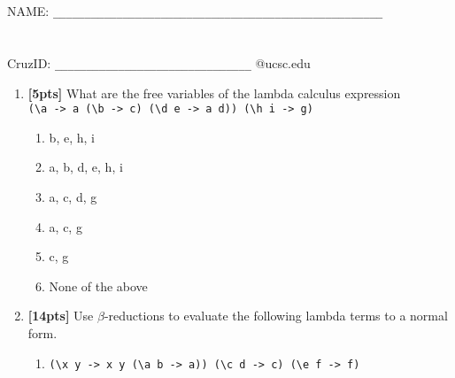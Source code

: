 \documentclass[paper=letter, fontsize=13pt]{article} %
\numberwithin{equation}{section} %
\newif\ifshowanswers\showanswersfalse
\begin{document}
\bigskip
\bigskip
\bigskip
\bigskip
\bigskip
\bigskip
\bigskip
\bigskip
\bigskip
\bigskip
\bigskip
\bigskip
\bigskip
\bigskip
\bigskip
\bigskip
\noindent NAME: \verb|____________________________________________________| \\
\bigskip\\ 
\bigskip\\
CruzID: \verb|_______________________________| @ucsc.edu

\newpage
{}

\bigskip

\begin{enumerate} 
 \item \textbf{[5pts]} What are the free variables of the lambda calculus expression \\
           \verb|(\a -> a (\b -> c) (\d e -> a d)) (\h i -> g)|
          \begin{enumerate}
          \item b, e, h, i
          \item a, b, d, e, h, i
          \item a, c, d, g
          \item a, c, g
          \item c, g
          \item None of the above
          \end{enumerate}

\ifshowanswers
ANSWER E: c, g
\fi

\item \textbf{[14pts]} Use $\beta$-reductions to evaluate the following lambda terms to a normal form. \\
\bigskip
\bigskip
\begin{enumerate}[label=(\Alph*)]
\item 
\verb|(\x y -> x y (\a b -> a)) (\c d -> c) (\e f -> f)|
\ifshowanswers
Rubric:
\begin{itemize}
\item 0 pts : no attempt or nothing correct.
\item 1 pts : anything correct (e.g., one reduction)
\item 2-5 pts : more than one thing correct (e.g., two reductions), few things incorrect
\item 6 pts : almost correct, but one smallish error
\item 7 pts : completely correct
\end{itemize}
\else
\bigskip
\bigskip
\bigskip
\bigskip
\bigskip
\bigskip
\bigskip
\bigskip
\bigskip
\bigskip
\bigskip
\bigskip
\bigskip
\bigskip
\bigskip
\bigskip
\fi


\end{enumerate}
\end{enumerate}
\end{document}
